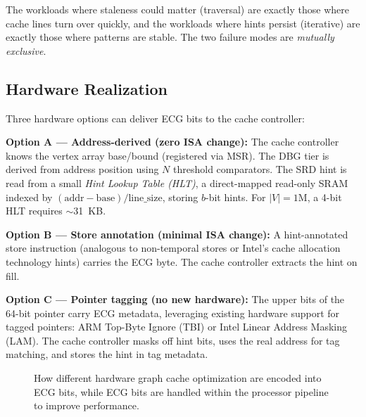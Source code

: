 \documentclass[conference]{IEEEtran}
\begin{document}
The workloads where staleness could matter (traversal) are exactly those where cache lines turn over quickly, and the workloads where hints persist (iterative) are exactly those where patterns are stable. The two failure modes are \emph{mutually exclusive}.

\subsection{Hardware Realization}

Three hardware options can deliver ECG bits to the cache controller:

\textbf{Option A --- Address-derived (zero ISA change):} The cache controller knows the vertex array base/bound (registered via MSR). The DBG tier is derived from address position using $N$ threshold comparators. The SRD hint is read from a small \emph{Hint Lookup Table (HLT)}, a direct-mapped read-only SRAM indexed by $(\text{addr} - \text{base}) / \text{line\_size}$, storing $b$-bit hints. For $|V|=1$M, a 4-bit HLT requires $\sim$31~KB.

\textbf{Option B --- Store annotation (minimal ISA change):} A hint-annotated store instruction (analogous to non-temporal stores or Intel's cache allocation technology hints) carries the ECG byte. The cache controller extracts the hint on fill.

\textbf{Option C --- Pointer tagging (no new hardware):} The upper bits of the 64-bit pointer carry ECG metadata, leveraging existing hardware support for tagged pointers: ARM Top-Byte Ignore (TBI) or Intel Linear Address Masking (LAM). The cache controller masks off hint bits, uses the real address for tag matching, and stores the hint in tag metadata.
%   

\begin{figure}[t]
  \centering
  
  \caption{How different hardware graph cache optimization are encoded into ECG bits, while ECG bits are handled within the processor pipeline to improve performance.}
  \label{fig:fig5}
\end{figure}
\end{document}
